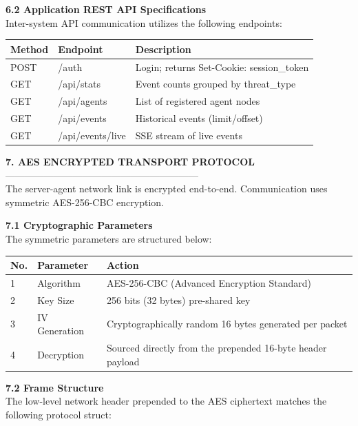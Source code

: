 \documentclass[12pt,a4paper]{article}
\newcommand{\thfmt}[1]{\textbf{#1}}
\begin{document}
\textbf{6.2 Application REST API Specifications}\\
Inter-system API communication utilizes the following endpoints:

\begin{center}
\begin{tabular}{C{2.0cm} L{4.2cm} L{8.3cm}}
\hline
\thfmt{Method} & \thfmt{Endpoint} & \thfmt{Description} \\
\hline
POST & /auth            & Login; returns Set-Cookie: session\_token \\
GET  & /api/\allowbreak stats       & Event counts grouped by threat\_type \\
GET  & /api/\allowbreak agents      & List of registered agent nodes \\
GET  & /api/\allowbreak events      & Historical events (limit/offset) \\
GET  & /api/\allowbreak events/\allowbreak live & SSE stream of live events \\
\hline
\end{tabular}
\end{center}

\vspace{1.5em}
\textbf{7. AES ENCRYPTED TRANSPORT PROTOCOL}\\
------------------------------------------------------------\\
The server-agent network link is encrypted end-to-end. Communication uses symmetric AES-256-CBC encryption.

\textbf{7.1 Cryptographic Parameters}\\
The symmetric parameters are structured below:

\begin{center}
\begin{tabular}{C{1.0cm} L{3.5cm} L{10.0cm}}
\hline
\thfmt{No.} & \thfmt{Parameter} & \thfmt{Action} \\
 & Algorithm & AES-256-CBC (Advanced Encryption Standard) \\
2 & Key Size & 256 bits (32 bytes) pre-shared key \\
3 & IV Generation & Cryptographically random 16 bytes generated per packet \\
4 & Decryption & Sourced directly from the prepended 16-byte header payload \\
\hline
\end{tabular}
\end{center}

\textbf{7.2 Frame Structure}\\
The low-level network header prepended to the AES ciphertext matches the following protocol struct:
\end{document}

